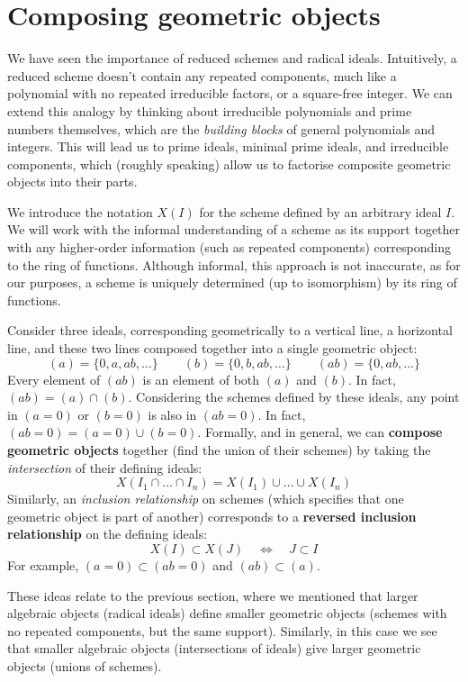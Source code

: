\documentclass[12pt]{article}
\begin{document}
\newpage
\section{Composing geometric objects}\label{Composing geometric objects}

We have seen the importance of reduced schemes and radical ideals. Intuitively, a reduced scheme doesn't contain any repeated components, much like a polynomial with no repeated irreducible factors, or a square-free integer. We can extend this analogy by thinking about irreducible polynomials and prime numbers themselves, which are the \emph{building blocks} of general polynomials and integers. This will lead us to prime ideals, minimal prime ideals, and irreducible components, which (roughly speaking) allow us to factorise composite geometric objects into their parts.

We introduce the notation $X(I)$ for the scheme defined by an arbitrary ideal $I$. We will work with the informal understanding of a scheme as its support together with any higher-order information (such as repeated components) corresponding to the ring of functions. Although informal, this approach is not inaccurate, as for our purposes, a scheme is uniquely determined (up to isomorphism) by its ring of functions.

Consider three ideals, corresponding geometrically to a vertical line, a horizontal line, and these two lines composed together into a single geometric object:
\[
(a)=\{0,a,ab,\dots\}\qquad (b)=\{0,b,ab,\dots\}\qquad (ab)=\{0,ab,\dots\}
\]
Every element of $(ab)$ is an element of both $(a)$ and $(b)$. In fact, $(ab)=(a)\cap(b)$. Considering the schemes defined by these ideals, any point in $(a=0)$ or $(b=0)$ is also in $(ab=0)$. In fact, $(ab=0)=(a=0)\cup(b=0)$. Formally, and in general, we can \textbf{compose geometric objects} together (find the union of their schemes) by taking the \emph{intersection} of their defining ideals:
\[
X(I_1 \cap \dots \cap I_n) = X(I_1) \cup \dots \cup X(I_n)
\]
Similarly, an \emph{inclusion relationship} on schemes (which specifies that one geometric object is part of another) corresponds to a \textbf{reversed inclusion relationship} on the defining ideals:
\[
X(I) \subset X(J) \quad \Longleftrightarrow \quad J \subset I
\]
For example, $(a=0) \subset (ab=0)$ and $(ab) \subset (a)$.

These ideas relate to the previous section, where we mentioned that larger algebraic objects (radical ideals) define smaller geometric objects (schemes with no repeated components, but the same support). Similarly, in this case we see that smaller algebraic objects (intersections of ideals) give larger geometric objects (unions of schemes).
\end{document}
